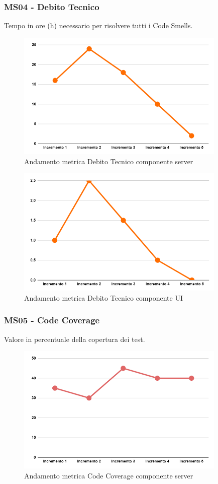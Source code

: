 \subsubsection{MS04 - Debito Tecnico}
Tempo in ore (h) necessario per risolvere tutti i Code Smells.
\begin{figure}[H]
	\centering
	\includegraphics[width=10cm]{images/metricheServer/debito_tecnico.png}
	\caption{Andamento metrica Debito Tecnico componente server}
\end{figure}
\begin{figure}[H]
	\centering
	\includegraphics[width=10cm]{images/metricheUI/debito_tecnico.png}
	\caption{Andamento metrica Debito Tecnico componente UI}
\end{figure}

\subsubsection{MS05 - Code Coverage}
Valore in percentuale della copertura dei test.
\begin{figure}[H]
	\centering
	\includegraphics[width=10cm]{images/metricheServer/code_coverage.png}
	\caption{Andamento metrica Code Coverage componente server}
\end{figure}

